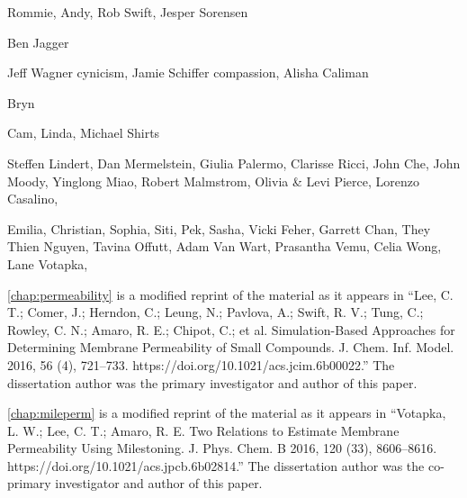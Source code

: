 \begin{frontmatter}
%
\tableofcontents
\listoffigures  %
\listoftables   %



%
%
\begin{acknowledgements}
\par Rommie, Andy, Rob Swift, Jesper Sorensen
\par Ben Jagger
\par Jeff Wagner cynicism, Jamie Schiffer compassion, Alisha Caliman
\par Bryn

\par Cam, Linda, Michael Shirts

\par Steffen Lindert, Dan Mermelstein, Giulia Palermo, Clarisse Ricci, John Che, John Moody, Yinglong Miao, Robert Malmstrom, Olivia \& Levi Pierce, Lorenzo Casalino,

\par Emilia, Christian, Sophia, Siti, Pek, Sasha, Vicki Feher, Garrett Chan, They Thien Nguyen, Tavina Offutt, Adam Van Wart, Prasantha Vemu, Celia Wong, Lane Votapka,

\par \cref{chap:permeability} is a modified reprint of the material as it appears in ``Lee, C. T.; Comer, J.; Herndon, C.; Leung, N.; Pavlova, A.; Swift, R. V.; Tung, C.; Rowley, C. N.; Amaro, R. E.; Chipot, C.; et al. Simulation-Based Approaches for Determining Membrane Permeability of Small Compounds. J. Chem. Inf. Model. 2016, 56 (4), 721–733. https://doi.org/10.1021/acs.jcim.6b00022.''
The dissertation author was the primary investigator and author of this paper.

\par \cref{chap:mileperm} is a modified reprint of the material as it appears in ``Votapka, L. W.; Lee, C. T.; Amaro, R. E. Two Relations to Estimate Membrane Permeability Using Milestoning. J. Phys. Chem. B 2016, 120 (33), 8606–8616. https://doi.org/10.1021/acs.jpcb.6b02814.''
        The dissertation author was the co-primary investigator and author of this paper.
\end{acknowledgements}



\end{frontmatter}
